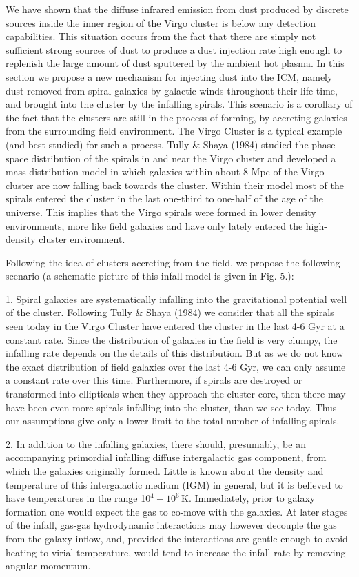 \documentclass[]{aa}
\begin{document}
We have shown that the diffuse infrared emission from dust produced by discrete
sources inside the inner region of the Virgo cluster is below any detection
capabilities. This situation occurs from the fact that there are simply not
sufficient strong sources of dust to produce a dust injection rate high enough
to replenish the large amount of dust sputtered by the ambient hot plasma. 
In this section we propose a new mechanism for injecting dust into the ICM,
namely dust removed from spiral galaxies by galactic winds throughout
their life time, and brought into the cluster by the 
infalling spirals. This scenario is a corollary of the fact that the clusters 
are still in the process of forming, by accreting galaxies from the 
surrounding field environment. The Virgo Cluster is
a typical example (and best studied) for such a process. Tully \& Shaya (1984)
studied the phase space distribution of the spirals in and near the Virgo
cluster and developed a mass distribution model in which galaxies within about
8 Mpc of the Virgo cluster are now falling back towards the cluster. Within
their model most of the spirals entered the cluster in the last one-third to
one-half of the age of the universe. This implies that the Virgo spirals were
formed in lower density environments, more like field galaxies and have only
lately entered the high-density cluster environment. 

Following the idea of clusters accreting from the field, we propose the
following scenario (a schematic picture of this infall model is given in 
Fig. 5.):

1. Spiral galaxies are systematically infalling into the gravitational
potential well of the cluster. Following Tully \& Shaya (1984) we consider 
that all the spirals seen today in the Virgo Cluster have entered the cluster 
in the last 4-6 Gyr at a constant rate. Since the distribution of galaxies in 
the field is very clumpy, the infalling rate depends on the details of this 
distribution. But as we do not know the exact distribution of field 
galaxies over the last 4-6 Gyr, 
we can only assume a constant rate over this time. 
Furthermore, if spirals are destroyed or transformed into
 ellipticals when they 
approach the cluster core, then there may have been even more
spirals infalling into the cluster, than we see today. Thus our assumptions
give only a lower limit to the total number of infalling spirals. 

2. In addition to the infalling galaxies, there should,
presumably, be an accompanying primordial infalling diffuse intergalactic gas
component, from which the galaxies originally formed. Little is known about the
density and temperature of this intergalactic medium (IGM) in general, but 
it is believed to have temperatures in the range 10$^4-10^6$\,K. 
Immediately, prior to galaxy formation
one would expect the gas to co-move with the galaxies. At later stages of the
infall, gas-gas hydrodynamic interactions may however decouple the gas from the
galaxy inflow, and, provided the interactions are gentle enough to avoid
heating to virial temperature, would tend to increase the infall rate by
removing angular momentum. 
\end{document}
